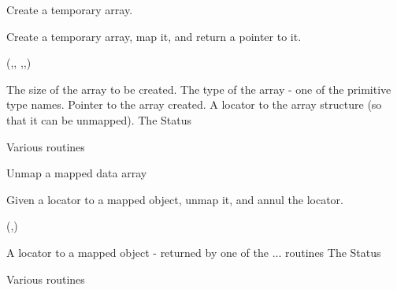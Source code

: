 \begin{manroutinedescription}
     Create a temporary array.

     Create a temporary array, map it, and return a pointer to it.

     {}

     {} {} ({},{},{%
},{},{})

\begin{manparametertable}
 The size of the %
array to be created.
 The type %
of the array -
                       one of the {} primitive type names.
 Pointer to the %
array created.
 A locator %
to the array
                       structure (so that it can be unmapped).
 The Status

\end{manparametertable}
     Various {} routines
\end{manroutinedescription}
\begin{manroutinedescription}
     Unmap a mapped data array

     Given a locator to a mapped object, unmap it, and annul the locator.

     {}

     {} {}({},{})

\begin{manparametertable}
 A locator %
to a mapped
                       object - returned by one of the {}... %
routines
 The Status

\end{manparametertable}
     Various {} routines
\end{manroutinedescription}
